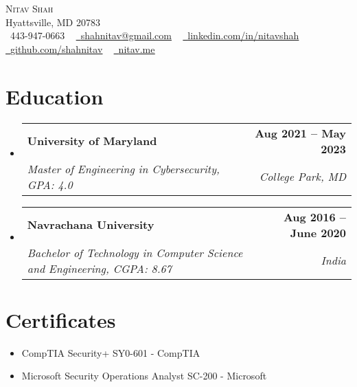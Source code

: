 \documentclass[letterpaper,11pt]{article}
\makeatletter
\newcommand{\resumeSubheading}[4]{
  \vspace{-2pt}\item
    \begin{tabular*}{1.0\textwidth}[t]{l@{\extracolsep{\fill}}r}
      \textbf{#1} & \textbf{\small #2} \\
      \textit{\small#3} & \textit{\small #4} \\
    \end{tabular*}\vspace{-7pt}
}
\newcommand{\resumeSubHeadingListStart}{\begin{itemize}[leftmargin=0.0in, label={}]}
\newcommand{\resumeSubHeadingListEnd}{\end{itemize}}
\makeatother
\begin{document}
\begin{center}
    {\Huge \scshape Nitav Shah} \\ \vspace{1pt}
    Hyattsville, MD 20783 \\ \vspace{1pt}
    \small \raisebox{-0.1\height}\faPhone\ 443-947-0663 ~ \href{mailto:shahnitav@gmail.com}{\raisebox{-0.2\height}\faEnvelope\  \underline{shahnitav@gmail.com}} ~ 
    \href{https://linkedin.com/in/nitavshah/}{\raisebox{-0.2\height}\faLinkedin\ \underline{linkedin.com/in/nitavshah}}  ~
    \href{https://github.com/shahnitav}{\raisebox{-0.2\height}\faGithub\ \underline{github.com/shahnitav}}  ~
    \href{https://nitav.me}{\raisebox{-0.2\height}\faGlobe\
    \underline{nitav.me}}
    \vspace{-8pt}
\end{center}


\section{Education}
  \resumeSubHeadingListStart
    \resumeSubheading
      {University of Maryland}{Aug 2021 -- May 2023}
      {Master of Engineering in Cybersecurity, GPA: 4.0}{College Park, MD}
  \resumeSubHeadingListEnd
  \vspace{-4pt}
  \resumeSubHeadingListStart
    \resumeSubheading
      {Navrachana University}{Aug 2016 -- June 2020}
      {Bachelor of Technology in Computer Science and Engineering, CGPA: 8.67}{India}
  \resumeSubHeadingListEnd
  
\section{Certificates}
        \begin{itemize}
            \item CompTIA Security+ SY0-601 - CompTIA
            \vspace{-0.8em} \item Microsoft Security Operations Analyst SC-200 - Microsoft
        \end{itemize}
\vspace{-16pt}

\end{document}
